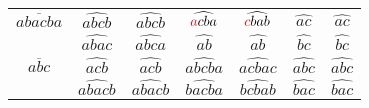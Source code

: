 \begin{table}[!t]
\begin{tabular}{| c |c c| c c| c c |}
\multirow{1}{*}{$\overline{abacba}$}&$\widehat{abcb}$&$\widehat{abcb}$&$\widehat{\textcolor{red}{a}cba}$ &$\widehat{\textcolor{red}{c}bab}$   & $\widehat{ac}$ & $\widehat{ac}$ \\  
 \rowcolor{gray!10}\multirow{1}{*}{$\overline{bcba}$}&$\widehat{abac}$ &$\widehat{abca}$&$\widehat{ab}$&$\widehat{ab}$  & $\widehat{bc}$& $\widehat{bc}$\\ \hline
 \hline
 \multirow{1}{*}{$\overline{abc}$}&$\widehat{acb}$&$\widehat{acb}$ &$\widehat{abcba}$  &$\widehat{acbac}$ & $\widehat{abc}$ & $\widehat{abc}$\\  
 \rowcolor{gray!10}\multirow{1}{*}{$\overline{abcba}$}&$\widehat{abacb}$&$\widehat{abacb}$&$\widehat{bacba}$  &$\widehat{bcbab}$ & $\widehat{bac}$& $\widehat{bac}$\\ \hline
\end{tabular}
\end{table}